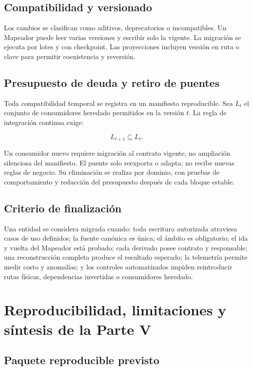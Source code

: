 \section{Compatibilidad y versionado}

Los cambios se clasifican como aditivos, deprecatorios o incompatibles. Un Mapeador puede
leer varias versiones y escribir solo la vigente. La migración se ejecuta por lotes y
con checkpoint. Las proyecciones incluyen versión en ruta o clave para permitir
coexistencia y reversión.

\section{Presupuesto de deuda y retiro de puentes}

Toda compatibilidad temporal se registra en un manifiesto reproducible. Sea \(L_t\) el
conjunto de consumidores heredado permitidos en la versión \(t\). La regla de integración
continua exige:

\[
L_{t+1}\subseteq L_t.
\]

Un consumidor nuevo requiere migración al contrato vigente, no ampliación silenciosa
del manifiesto. El puente solo reexporta o adapta; no recibe nuevas reglas de negocio. Su
eliminación se realiza por dominio, con pruebas de comportamiento y reducción del
presupuesto después de cada bloque estable.

\section{Criterio de finalización}

Una entidad se considera migrada cuando: toda escritura autorizada atraviesa casos de
uso definidos; la fuente canónica es única; el ámbito es obligatorio; el ida y vuelta del
Mapeador está probado; cada derivado posee contrato y responsable; una reconstrucción completa
produce el resultado esperado; la telemetría permite medir costo y anomalías; y los
controles automatizados impiden reintroducir rutas físicas, dependencias invertidas o consumidores heredado.

\chapter{Reproducibilidad, limitaciones y síntesis de la Parte V}

\section{Paquete reproducible previsto}

